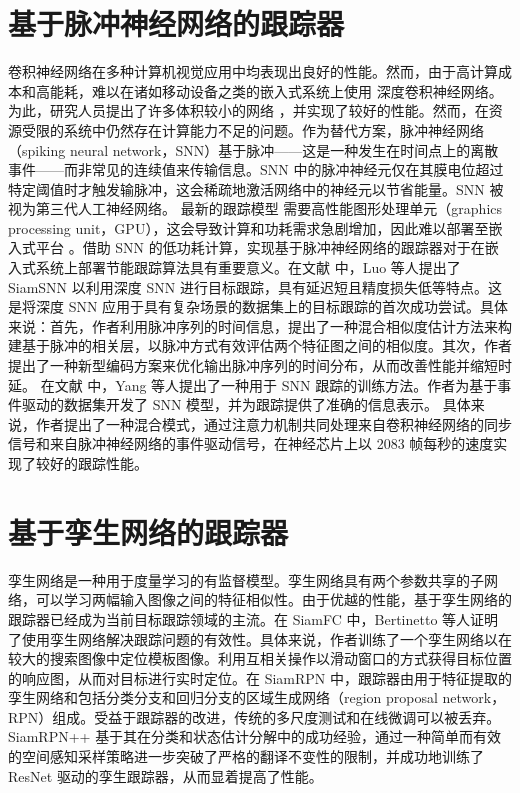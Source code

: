 \section{基于脉冲神经网络的跟踪器}%
卷积神经网络在多种计算机视觉应用中均表现出良好的性能。然而，由于高计算成本和高能耗，难以在诸如移动设备之类的嵌入式系统上使用 深度卷积神经网络。为此，研究人员提出了许多体积较小的网络 \cite{wei2018quantization}，并实现了较好的性能。然而，在资源受限的系统中仍然存在计算能力不足的问题。作为替代方案，脉冲神经网络（spiking neural network，SNN）基于脉冲——这是一种发生在时间点上的离散事件——而非常见的连续值来传输信息。SNN 中的脉冲神经元仅在其膜电位超过特定阈值时才触发输脉冲，这会稀疏地激活网络中的神经元以节省能量。SNN 被视为第三代人工神经网络。
最新的跟踪模型 \cite{SiamFC,SiamRPN} 需要高性能图形处理单元（graphics processing unit，GPU），这会导致计算和功耗需求急剧增加，因此难以部署至嵌入式平台 \cite{basu2018low}。借助 SNN 的低功耗计算，实现基于脉冲神经网络的跟踪器对于在嵌入式系统上部署节能跟踪算法具有重要意义。在文献 \cite{SiamSNN} 中，Luo 等人提出了 SiamSNN 以利用深度 SNN 进行目标跟踪，具有延迟短且精度损失低等特点。这是将深度 SNN 应用于具有复杂场景的数据集上的目标跟踪的首次成功尝试。具体来说：首先，作者利用脉冲序列的时间信息，提出了一种混合相似度估计方法来构建基于脉冲的相关层，以脉冲方式有效评估两个特征图之间的相似度。其次，作者提出了一种新型编码方案来优化输出脉冲序列的时间分布，从而改善性能并缩短时延。
在文献 \cite{DashNet} 中，Yang 等人提出了一种用于 SNN 跟踪的训练方法。作者为基于事件驱动的数据集开发了 SNN 模型，并为跟踪提供了准确的信息表示。
具体来说，作者提出了一种混合模式，通过注意力机制共同处理来自卷积神经网络的同步信号和来自脉冲神经网络的事件驱动信号，在神经芯片上以 2083 帧每秒的速度实现了较好的跟踪性能。%
\section{基于孪生网络的跟踪器}
孪生网络是一种用于度量学习的有监督模型。孪生网络具有两个参数共享的子网络，可以学习两幅输入图像之间的特征相似性。由于优越的性能，基于孪生网络的跟踪器已经成为当前目标跟踪领域的主流。在 SiamFC \cite{SiamFC} 中，Bertinetto 等人证明了使用孪生网络解决跟踪问题的有效性。具体来说，作者训练了一个孪生网络以在较大的搜索图像中定位模板图像。利用互相关操作以滑动窗口的方式获得目标位置的响应图，从而对目标进行实时定位。在 SiamRPN \cite{SiamRPN} 中，跟踪器由用于特征提取的孪生网络和包括分类分支和回归分支的区域生成网络（region proposal network，RPN）组成。受益于跟踪器的改进，传统的多尺度测试和在线微调可以被丢弃。SiamRPN++ \cite{SiamRPN++} 基于其在分类和状态估计分解中的成功经验，通过一种简单而有效的空间感知采样策略进一步突破了严格的翻译不变性的限制，并成功地训练了 ResNet \cite{ResNet} 驱动的孪生跟踪器，从而显着提高了性能。

